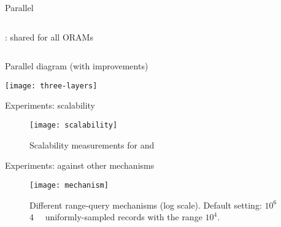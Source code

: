 \begin{frame}{Parallel \epsolute{}}
\begin{columns}[t]
\begin{column}{0.5\textwidth}
{\begin{block}{\protocolShared{}: shared \serverDS{} for all ORAMs}
					\end{block}
				}

			\end{column}


		\end{columns}


	\end{frame}

	\begin{frame}{Parallel \epsolute{} diagram (with improvements)}

		\centering
		\texttt{[image: three-layers]}

	\end{frame}

	\begin{frame}{Experiments: scalability}

		\begin{figure}[h]
			\centering
			\texttt{[image: scalability]}
			\caption{Scalability measurements for \protocolShared{} and \protocolSeparate{}}%
		\end{figure}

	\end{frame}

	\begin{frame}{Experiments: against other mechanisms}

		\begin{figure}[h]
			\centering
			\texttt{[image: mechanism]}
			\caption{
				\centering
				Different range-query mechanisms (log scale).  %
				Default setting: $10^6$ \SI{4}{\kibi\byte} uniformly-sampled records with the range $10^4$.
			}%
		\end{figure}

	\end{frame}
